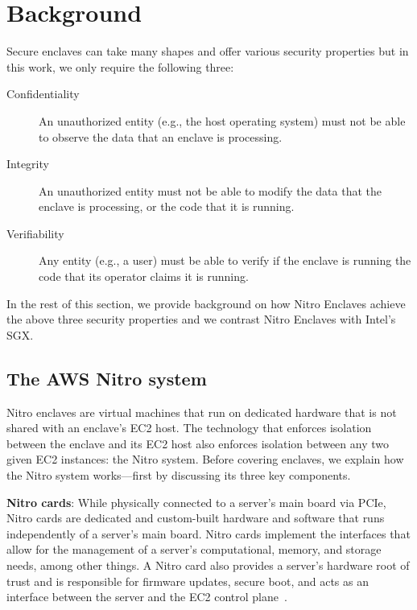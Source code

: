 \section{Background}%
\label{sec:background}

Secure enclaves can take many shapes and offer various security properties but
in this work, we only require the following three:

\begin{description}

  \item[Confidentiality] An unauthorized entity (e.g., the host operating
    system) must not be able to observe the data that an enclave is processing.

  \item[Integrity] An unauthorized entity must not be able to modify the data
    that the enclave is processing, or the code that it is running.

  \item[Verifiability] Any entity (e.g., a user) must be able to verify if the
    enclave is running the code that its operator claims it is running.

\end{description}

In the rest of this section, we provide background on how Nitro Enclaves
achieve the above three security properties and we contrast Nitro Enclaves with
Intel's SGX.

\subsection{The AWS Nitro system}%
\label{sec:nitro}

Nitro enclaves are virtual machines that run on dedicated hardware that is not
shared with an enclave's EC2 host.  The technology that enforces isolation
between the enclave and its EC2 host also enforces isolation between any two
given EC2 instances: the Nitro system.  Before covering enclaves, we explain how
the Nitro system works---first by discussing its three key components.

\textbf{Nitro cards}: While physically connected to a server's main board via
PCIe, Nitro cards are dedicated and custom-built hardware and software that runs
independently of a server's main board.  Nitro cards implement the interfaces
that allow for the management of a server's computational, memory, and storage
needs, among other things.  A Nitro card also provides a server's hardware root
of trust and is responsible for firmware updates, secure boot, and acts as an
interface between the server and the EC2 control plane~\cite[pp.
7--10]{Bean2022a}.

